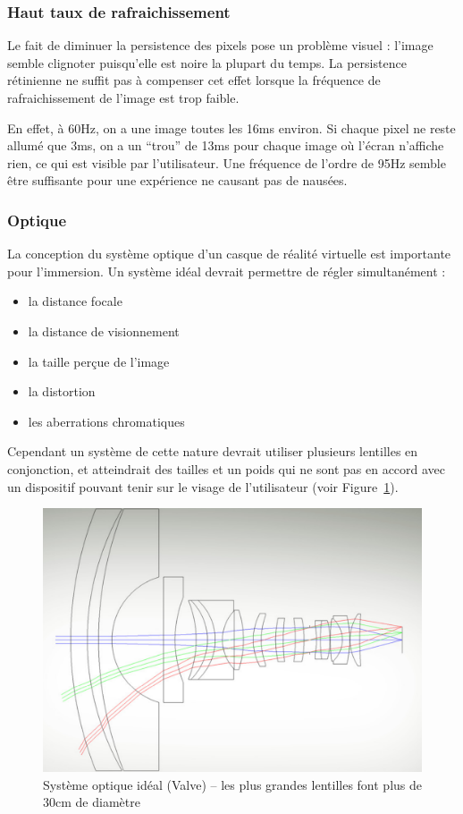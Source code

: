 \documentclass[a4,12pt]{scrartcl}
\begin{document}
\subsubsection{Haut taux de rafraichissement}

Le fait de diminuer la persistence des pixels pose un problème visuel : l'image semble clignoter puisqu'elle est noire la plupart du temps. La persistence rétinienne ne suffit pas à compenser cet effet lorsque la fréquence de rafraichissement de l'image est trop faible.

En effet, à 60Hz, on a une image toutes les 16ms environ. Si chaque pixel ne reste allumé que 3ms, on a un “trou” de 13ms pour chaque image où l’écran n’affiche rien, ce qui est visible par l’utilisateur. Une fréquence de l’ordre de 95Hz semble être suffisante pour une expérience ne causant pas de nausées.


\subsubsection{Optique}

La conception du système optique d’un casque de réalité virtuelle est importante pour l’immersion. Un système idéal devrait permettre de régler simultanément : 
\begin{itemize}
	\item la distance focale
	\item la distance de visionnement
	\item la taille perçue de l’image
	\item la distortion
	\item les aberrations chromatiques
\end{itemize}

Cependant un système de cette nature devrait utiliser plusieurs lentilles en conjonction, et atteindrait des tailles et un poids qui ne sont pas en accord avec un dispositif pouvant tenir sur le visage de l’utilisateur (voir Figure~\ref{ideal-lens}).

\begin{figure}[H]
	\centering
	\includegraphics[width=0.6\linewidth]{lens}
	\caption{Système optique idéal (Valve) -- les plus grandes lentilles font plus de 30cm de diamètre}
	\label{ideal-lens}
\end{figure}
\end{document}
